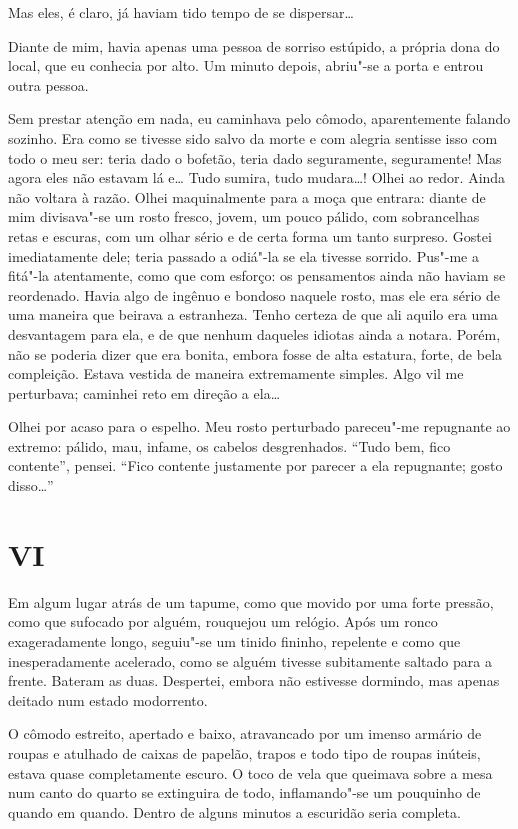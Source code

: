 Mas eles, é claro, já haviam tido tempo de se dispersar\ldots{}

Diante de mim, havia apenas uma pessoa de sorriso estúpido, a própria
dona do local, que eu conhecia por alto. Um minuto depois, abriu"-se a
porta e entrou outra pessoa.

Sem prestar atenção em nada, eu caminhava pelo cômodo, aparentemente
falando sozinho. Era como se tivesse sido salvo da morte e com alegria
sentisse isso com todo o meu ser: teria dado o bofetão, teria dado
seguramente, seguramente! Mas agora eles não estavam lá e\ldots{} Tudo
sumira, tudo mudara\ldots{}! Olhei ao redor. Ainda não voltara à razão.
Olhei maquinalmente para a moça que entrara: diante de mim divisava"-se
um rosto fresco, jovem, um pouco pálido, com sobrancelhas retas e
escuras, com um olhar sério e de certa forma um tanto surpreso. Gostei
imediatamente dele; teria passado a odiá"-la se ela tivesse sorrido.
Pus"-me a fitá"-la atentamente, como que com esforço: os pensamentos
ainda não haviam se reordenado. Havia algo de ingênuo e bondoso naquele
rosto, mas ele era sério de uma maneira que beirava a estranheza. Tenho
certeza de que ali aquilo era uma desvantagem para ela, e de que nenhum
daqueles idiotas ainda a notara. Porém, não se poderia dizer que era
bonita, embora fosse de alta estatura, forte, de bela compleição.
Estava vestida de maneira extremamente simples. Algo vil me perturbava;
caminhei reto em direção a ela\ldots{}

Olhei por acaso para o espelho. Meu rosto perturbado pareceu"-me
repugnante ao extremo: pálido, mau, infame, os cabelos desgrenhados.
“Tudo bem, fico contente”, pensei. “Fico contente justamente por
parecer a ela repugnante; gosto disso\ldots{}”


\section{VI}

Em algum lugar atrás de um tapume, como que movido por uma forte
pressão, como que sufocado por alguém, rouquejou um relógio. Após um
ronco exageradamente longo, seguiu"-se um tinido fininho, repelente e
como que inesperadamente acelerado, como se alguém tivesse subitamente
saltado para a frente. Bateram as duas. Despertei, embora não estivesse
dormindo, mas apenas deitado num estado modorrento.

O cômodo estreito, apertado e baixo, atravancado por um imenso armário
de roupas e atulhado de caixas de papelão, trapos e todo tipo de roupas
inúteis, estava quase completamente escuro. O toco de vela que queimava
sobre a mesa num canto do quarto se extinguira de todo, inflamando"-se
um pouquinho de quando em quando. Dentro de alguns minutos a escuridão
seria completa.

